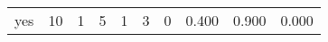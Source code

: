 \begin{longtable}{lp{1.3cm}p{1.3cm}p{1.3cm}p{1.3cm}p{1.3cm}p{1.3cm}p{1.3cm}p{1.3cm}p{1.3cm}}
yes       &                     10 &                                             1 &                                            5 &                                           1 &                                            3 &                                          0 &                                0.400 &                                  0.900 &                                0.000 \\
\end{longtable}
